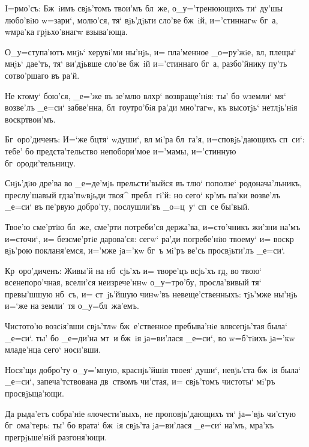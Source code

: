 
I=рмо'съ: Бж~iимъ свjь'томъ твои'мъ бл~же, 
о_у='тренюющихъ ти` ду'шы любо'вiю w=зари`, молю'ся, тя` 
вjь'дjьти сло'ве бж~iй, и='стиннагw бг~а, w\т мра'ка 
грjьхо'внагw взыва'юща.

О_у=ступа'ютъ мнjь` херувi'ми ны'нjь, и= пла'менное 
_о=ру'жiе, вл, плещы` мнjь` дае'тъ, тя` ви'дjьвше 
сло'ве бж~iй и='стиннаго бг~а, разбо'йнику пу'ть 
сотво'ршаго въ ра'й.

Не ктому` бою'ся, _е='же въ зе'млю вл хр` 
возвраще'нiя: ты' бо w\т земли` мя` возве'лъ _е=си` 
забве'нна, бл~гоутро'бiя ра'ди мно'гагw, къ высотjь` 
нетлjь'нiя воскр твои'мъ.

Бг~оро'диченъ: И=`же бц тя` w\т души`, вл 
мi'ра бл~га'я, и=сповjь'дающихъ сп~си`: тебе' бо 
предста'тельство непобори'мое и='мамы, и='стинную 
бг~ороди'тельницу. 


Снjь'дiю дре'ва во _е=де'мjь прельсти'выйся въ тлю` 
поползе` родонача'льникъ, преслу'шавый гд за'пwвjьди 
твоя^ пребл~гi'й: но сего` кр'мъ па'ки возве'лъ 
_е=си` въ пе'рвую добро'ту, послушли'въ _о=ц~у` сп~се 
бы'вый.

Твое'ю сме'ртiю бл~же, сме'рти потреби'ся держа'ва, 
и=сто'чникъ жи'зни на'мъ и=сточи`, и= безсме'ртiе 
дарова'ся: сегw` ра'ди погребе'нiю твоему` и= воскр 
вjь'рою покланя'емся, и='мже jа='кw бг~ъ мi'ръ ве'сь 
просвjьти'лъ _е=си`.

Кр~оро'диченъ: Живы'й на нб~сjь'хъ и= творе'цъ 
всjь'хъ гд, во твою` всенепоро'чная, всели'ся 
неизрече'ннw о_у=тро'бу, просла'вивый тя` превы'шшую 
нб~съ, и= ст~jь'йшую чинw'въ невеще'ственныхъ: тjь'мже 
ны'нjь и=`же на земли' тя о_у=бл~жа'емъ. 


Чистото'ю возсiя'вши свjь'тлw бж~е'ственное 
пребыва'нiе вл всепjь'тая была` _е=си`. ты' бо 
_е=ди'на мт~и бж~iя jа=ви'лася _е=си`, во w=б'тiихъ 
jа='кw младе'нца сего` носи'вши.

Нося'щи добро'ту о_у='мную, краснjь'йшiя твоея` души`, 
невjь'ста бж~iя была` _е=си`, запеча'тствована дв~ствомъ 
чи'стая, и= свjь'томъ чистоты` мi'ръ просвjьща'ющи.

Да рыда'етъ собра'нiе sлочести'выхъ, не 
проповjь'дающихъ тя` jа='вjь чи'стую бг~ома'терь: ты' бо 
врата` бж~iя свjь'та jа=ви'лася _е=си` на'мъ, мра'къ 
прегрjьше'нiй разгоня'ющи.

